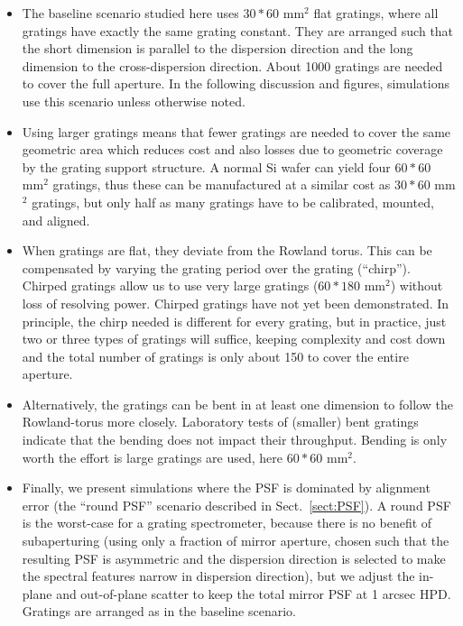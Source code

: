\documentclass[12pt]{spieman}  %
\begin{document}
\begin{spacing}{1}
\begin{itemize}
  \item The baseline scenario studied here uses $30 * 60$ mm$^2$ flat gratings, where all gratings have exactly the same grating constant. They are arranged such that the short dimension is parallel to the dispersion direction and the long dimension to the cross-dispersion direction. About 1000 gratings are needed to cover the full aperture. In the following discussion and figures, simulations use this scenario unless otherwise noted.
  \item Using larger gratings means that fewer gratings are needed to cover the same geometric area which reduces cost and also losses due to geometric coverage by the grating support structure. A normal Si wafer can yield four $60 * 60$ mm$^2$ gratings, thus these can be manufactured at a similar cost as $30 * 60$ mm$^2$ gratings, but only half as many gratings have to be calibrated, mounted, and aligned.
  \item When gratings are flat, they deviate from the Rowland torus. This can be compensated by varying the grating period over the grating (``chirp''). Chirped gratings allow us to use very large gratings ($60 * 180$ mm$^2$) without loss of resolving power. Chirped gratings have not yet been demonstrated. In principle, the chirp needed is different for every grating, but in practice, just two or three types of gratings will suffice\cite{10.1117/12.2562878}, keeping complexity and cost down and the total number of gratings is only about 150 to cover the entire aperture.
  \item Alternatively, the gratings can be bent in at least one dimension to follow the Rowland-torus more closely. Laboratory tests of (smaller) bent gratings indicate that the bending does not impact their throughput\cite{10.1117/12.2274205}. Bending is only worth the effort is large gratings are used, here $60 * 60$ mm$^2$.
  \item Finally, we present simulations where the PSF is dominated by alignment error (the ``round PSF'' scenario described in Sect.~\ref{sect:PSF}). A round PSF is the worst-case for a grating spectrometer, because there is no benefit of subaperturing (using only a fraction of mirror aperture, chosen such that the resulting PSF is asymmetric and the dispersion direction is selected to make the spectral features narrow in dispersion direction), but we adjust the in-plane and out-of-plane scatter to keep the total mirror PSF at 1 arcsec HPD. Gratings are arranged as in the baseline scenario.
\end{itemize}



\end{spacing}
\end{document}
